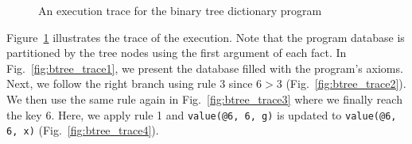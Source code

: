 \begin{figure}[t]
\centering
{}
\caption{An execution trace for the binary tree dictionary program}
\label{fig:btree_trace}
\end{figure}

Figure~\ref{fig:btree_trace} illustrates the trace of the
execution. Note that the program database is partitioned by the tree
nodes using the first argument of each fact. In
Fig.~\ref{fig:btree_trace1}, we present the database filled with the
program's axioms. Next, we follow the right branch using rule 3 since
$6 > 3$ (Fig.~\ref{fig:btree_trace2}). We then use the same rule
again in Fig.~\ref{fig:btree_trace3} where we finally reach the key
6. Here, we apply rule 1 and \texttt{value(@6, 6, g)} is updated to
\texttt{value(@6, 6, x)} (Fig.~\ref{fig:btree_trace4}).

